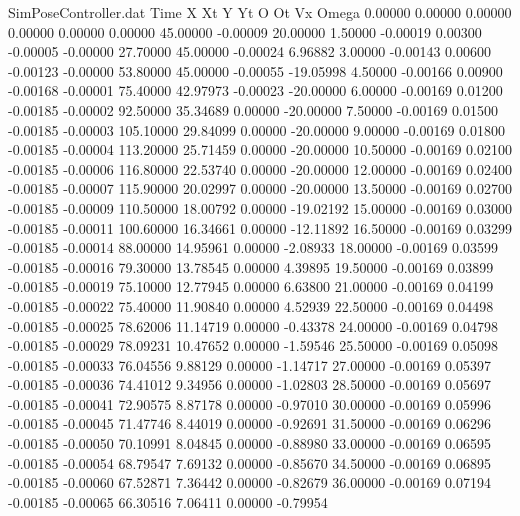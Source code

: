 \begin{filecontents}{SimPoseController.dat}
Time X Xt Y Yt O Ot Vx Omega
   0.00000    0.00000    0.00000     0.00000    0.00000    0.00000   45.00000   -0.00009   20.00000
   1.50000   -0.00019    0.00300    -0.00005   -0.00000   27.70000   45.00000   -0.00024    6.96882
   3.00000   -0.00143    0.00600    -0.00123   -0.00000   53.80000   45.00000   -0.00055  -19.05998
   4.50000   -0.00166    0.00900    -0.00168   -0.00001   75.40000   42.97973   -0.00023  -20.00000
   6.00000   -0.00169    0.01200    -0.00185   -0.00002   92.50000   35.34689    0.00000  -20.00000
   7.50000   -0.00169    0.01500    -0.00185   -0.00003  105.10000   29.84099    0.00000  -20.00000
   9.00000   -0.00169    0.01800    -0.00185   -0.00004  113.20000   25.71459    0.00000  -20.00000
  10.50000   -0.00169    0.02100    -0.00185   -0.00006  116.80000   22.53740    0.00000  -20.00000
  12.00000   -0.00169    0.02400    -0.00185   -0.00007  115.90000   20.02997    0.00000  -20.00000
  13.50000   -0.00169    0.02700    -0.00185   -0.00009  110.50000   18.00792    0.00000  -19.02192
  15.00000   -0.00169    0.03000    -0.00185   -0.00011  100.60000   16.34661    0.00000  -12.11892
  16.50000   -0.00169    0.03299    -0.00185   -0.00014   88.00000   14.95961    0.00000   -2.08933
  18.00000   -0.00169    0.03599    -0.00185   -0.00016   79.30000   13.78545    0.00000    4.39895
  19.50000   -0.00169    0.03899    -0.00185   -0.00019   75.10000   12.77945    0.00000    6.63800
  21.00000   -0.00169    0.04199    -0.00185   -0.00022   75.40000   11.90840    0.00000    4.52939
  22.50000   -0.00169    0.04498    -0.00185   -0.00025   78.62006   11.14719    0.00000   -0.43378
  24.00000   -0.00169    0.04798    -0.00185   -0.00029   78.09231   10.47652    0.00000   -1.59546
  25.50000   -0.00169    0.05098    -0.00185   -0.00033   76.04556    9.88129    0.00000   -1.14717
  27.00000   -0.00169    0.05397    -0.00185   -0.00036   74.41012    9.34956    0.00000   -1.02803
  28.50000   -0.00169    0.05697    -0.00185   -0.00041   72.90575    8.87178    0.00000   -0.97010
  30.00000   -0.00169    0.05996    -0.00185   -0.00045   71.47746    8.44019    0.00000   -0.92691
  31.50000   -0.00169    0.06296    -0.00185   -0.00050   70.10991    8.04845    0.00000   -0.88980
  33.00000   -0.00169    0.06595    -0.00185   -0.00054   68.79547    7.69132    0.00000   -0.85670
  34.50000   -0.00169    0.06895    -0.00185   -0.00060   67.52871    7.36442    0.00000   -0.82679
  36.00000   -0.00169    0.07194    -0.00185   -0.00065   66.30516    7.06411    0.00000   -0.79954

\end{filecontents}
